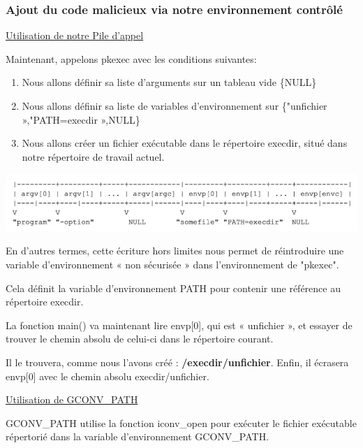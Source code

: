 \documentclass[12pt,a4paper]{article}
\begin{document}
\begin{flushleft}
                \subsubsection{Ajout du code malicieux via notre environnement contrôlé}
                \item \underline{Utilisation de notre Pile d'appel}
                     \item Maintenant, appelons pkexec avec les conditions suivantes:
                     \begin{enumerate}
                         \item Nous allons définir sa liste d’arguments sur un tableau vide \{NULL\}
                         \item Nous allons définir sa liste de variables d’environnement sur \{"unfichier »,"PATH=execdir »,NULL\}
                         \item Nous allons créer un fichier exécutable dans le répertoire execdir, situé dans notre répertoire de travail actuel.
                     \end{enumerate}
                 \begin{center}
                    \includegraphics[scale=0.4]{image} \cite{CVE2021425:online}
                 \end{center}
                \item En d'autres termes, cette écriture hors limites nous permet de réintroduire une variable d’environnement « non sécurisée » dans l'environnement de "pkexec".
                \item Cela définit la variable d’environnement PATH pour contenir une référence au répertoire execdir. 
                \item La fonction main() va maintenant lire envp[0], qui est « unfichier », et essayer de trouver le chemin absolu de celui-ci dans le répertoire courant. 
                \item Il le trouvera, comme nous l’avons créé :  \textbf{/execdir/unfichier}. Enfin, il écrasera envp[0] avec le chemin absolu execdir/unfichier.
            \item \underline{Utilisation de GCONV\_PATH}
            \item GCONV\_PATH utilise la fonction iconv\_open pour exécuter le fichier exécutable répertorié dans la variable d’environnement GCONV\_PATH.

\end{flushleft}
\end{document}

